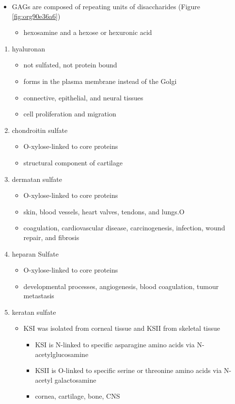 \documentclass{scrartcl}
\begin{document}
\begin{itemize}
\item GAGs are composed of repeating units of disaccharides (Figure \ref{fig:org90e36a6})
\begin{itemize}
\item hexosamine and a hexose or hexuronic acid
\end{itemize}
\end{itemize}
\begin{enumerate}
\item hyaluronan
\label{sec:orgec3acf8}
\begin{itemize}
\item not sulfated, not protein bound
\item forms in the plasma membrane instead of the Golgi
\item connective, epithelial, and neural tissues
\item cell proliferation and migration
\end{itemize}

\item chondroitin sulfate
\label{sec:org1725173}
\begin{itemize}
\item O-xylose-linked to core proteins
\item structural component of cartilage
\end{itemize}

\item dermatan sulfate
\label{sec:org7add189}
\begin{itemize}
\item O-xylose-linked to core proteins
\item skin, blood vessels, heart valves, tendons, and lungs.O
\item coagulation, cardiovascular disease, carcinogenesis, infection, wound repair, and fibrosis
\end{itemize}

\item heparan Sulfate
\label{sec:orgaa12494}
\begin{itemize}
\item O-xylose-linked to core proteins
\item developmental processes, angiogenesis, blood coagulation, tumour metastasis
\end{itemize}

\item keratan sulfate
\label{sec:org469f8e3}
\begin{itemize}
\item KSI was isolated from corneal tissue and KSII from skeletal tissue
\begin{itemize}
\item KSI is N-linked to specific asparagine amino acids via
N-acetylglucosamine
\item KSII is O-linked to specific serine or threonine amino acids via
N-acetyl galactosamine
\item cornea, cartilage, bone, CNS
\end{itemize}
\end{itemize}



\end{enumerate}
\end{document}
